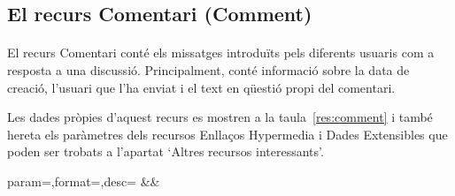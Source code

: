\subsection{El recurs Comentari (Comment)}

    \paragraph{}
    El recurs Comentari conté els missatges introduïts pels diferents usuaris com a resposta a una discussió. Principalment, conté informació sobre la data de creació, l'usuari que l'ha enviat i el text en qüestió propi del comentari.

    Les dades pròpies d'aquest recurs es mostren a la taula~\ref{res:comment} i també hereta els paràmetres dels recursos Enllaços Hypermedia i Dades Extensibles que poden ser trobats a l'apartat `Altres recursos interessants'.

    \begin{center}
             {param=\param,format=\format,desc=\desc}
             {\param&\format&\desc}
     \end{center}
